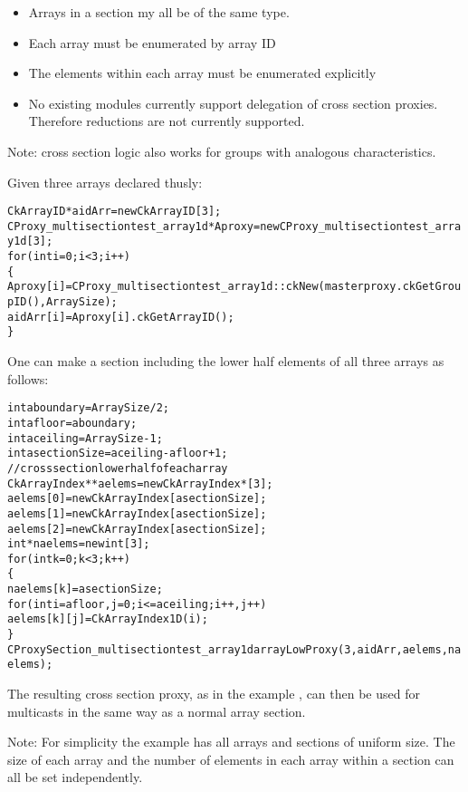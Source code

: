 \begin{itemize}

\item Arrays in a section my all be of the same type.

\item Each array must be enumerated by array ID

\item The elements within each array must be enumerated explicitly

\item No existing modules currently support delegation of cross
  section proxies.  Therefore reductions are not currently supported.

\end{itemize}

Note: cross section logic also works for groups with analogous characteristics.

Given three arrays declared thusly:

\begin{alltt}
	  CkArrayID *aidArr= new CkArrayID[3];
	  CProxy\_multisectiontest\_array1d *Aproxy= new CProxy\_multisectiontest\_array1d[3];
	  for(int i=0;i<3;i++)
	    \{
	      Aproxy[i]=CProxy\_multisectiontest\_array1d::ckNew(masterproxy.ckGetGroupID(),ArraySize);	  
	      aidArr[i]=Aproxy[i].ckGetArrayID();
	    \}
\end{alltt}

One can make a section including the  lower half elements of all three
arrays as follows:

\begin{alltt}
	  int aboundary=ArraySize/2;
	  int afloor=aboundary;
	  int aceiling=ArraySize-1;
	  int asectionSize=aceiling-afloor+1;
	  // cross section lower half of each array
	  CkArrayIndex **aelems= new CkArrayIndex*[3];
	  aelems[0]= new CkArrayIndex[asectionSize];
	  aelems[1]= new CkArrayIndex[asectionSize];
	  aelems[2]= new CkArrayIndex[asectionSize];
	  int *naelems=new int[3];
	  for(int k=0;k<3;k++)
	    \{
	      naelems[k]=asectionSize;
	      for(int i=afloor,j=0;i<=aceiling;i++,j++)
	        aelems[k][j]=CkArrayIndex1D(i);
	    \}
	  CProxySection\_multisectiontest\_array1d arrayLowProxy(3,aidArr,aelems,naelems);
\end{alltt}



The resulting cross section proxy, as in the example ,
can then be used for multicasts in the same way as a normal array
section.

Note: For simplicity the example has all arrays and sections of uniform
size.  The size of each array and the number of elements in each array
within a section can all be set independently.


